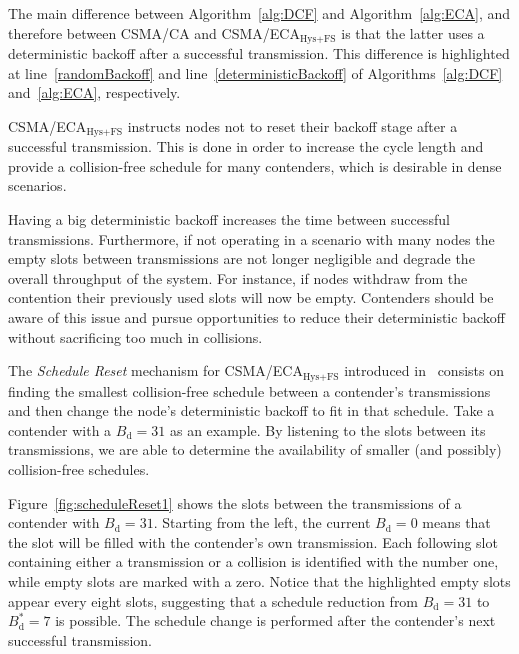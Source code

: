 The main difference between Algorithm~\ref{alg:DCF} and Algorithm~\ref{alg:ECA}, and therefore between CSMA/CA and CSMA/ECA$_{\text{Hys+FS}}$ is that the latter uses a deterministic backoff after a successful transmission. This difference is highlighted at line~\ref{randomBackoff} and line~\ref{deterministicBackoff} of Algorithms~\ref{alg:DCF} and~\ref{alg:ECA}, respectively.

CSMA/ECA$_{\text{Hys+FS}}$ instructs nodes not to reset their backoff stage after a successful transmission. This is done in order to increase the cycle length and provide a collision-free schedule for many contenders, which is desirable in dense scenarios.


Having a big deterministic backoff increases the time between successful transmissions. Furthermore, if not operating in a scenario with many nodes the empty slots between transmissions are not longer negligible and degrade the overall throughput of the system. For instance, if nodes withdraw from the contention their previously used slots will now be empty. Contenders should be aware of this issue and pursue opportunities to reduce their deterministic backoff without sacrificing too much in collisions. 

The \emph{Schedule Reset} mechanism for CSMA/ECA$_{\text{Hys+FS}}$ introduced in~\cite{sanabria2014high} consists on finding the smallest collision-free schedule between a contender's transmissions and then change the node's deterministic backoff to fit in that schedule. Take a contender with a $B_{\text{d}}=31$ as an example. By listening to the slots between its transmissions, we are able to determine the availability of smaller (and possibly) collision-free schedules. 

Figure~\ref{fig:scheduleReset1} shows the slots between the transmissions of a contender with $B_{\text{d}}=31$. Starting from the left, the current $B_{\text{d}}=0$ means that the slot will be filled with the contender's own transmission. Each following slot containing either a transmission or a collision is identified with the number one, while empty slots are marked with a zero. Notice that the highlighted empty slots appear every eight slots, suggesting that a schedule reduction from $B_{\text{d}}=31$ to $B_{\text{d}}^{*}=7$ is possible. The schedule change is performed after the contender's next successful transmission. 

